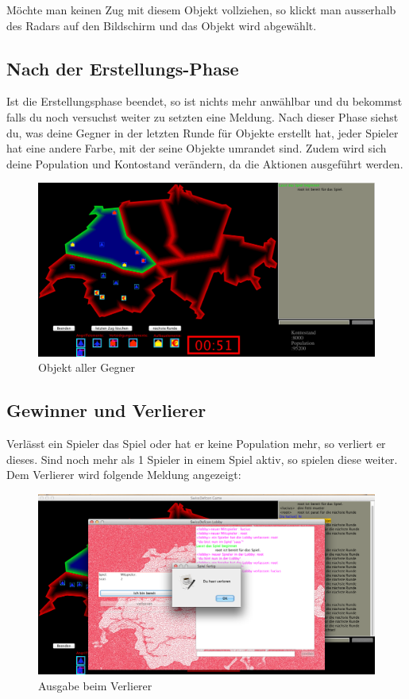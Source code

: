 \documentclass[ngerman, 12pt, pdftex]{scrartcl}[2006/07/30]
\begin{document}
Möchte man keinen Zug mit diesem Objekt vollziehen, so klickt man ausserhalb des Radars auf den Bildschirm und das Objekt wird abgewählt.

\newpage

\subsection{Nach der Erstellungs-Phase}

Ist die Erstellungsphase beendet, so ist nichts mehr anwählbar und du bekommst falls du noch versuchst weiter zu setzten eine Meldung.
Nach dieser Phase siehst du, was deine Gegner in der letzten Runde für Objekte erstellt hat, jeder Spieler hat eine andere Farbe, mit der seine Objekte umrandet sind. Zudem wird sich deine Population und Kontostand verändern, da die Aktionen ausgeführt werden.

\begin{figure}[h]
\centering
\includegraphics[scale=0.3]{spiel/Objekt_gegner.png}
\caption{Objekt aller Gegner}
\end{figure}

\newpage

\subsection{Gewinner und Verlierer}

Verlässt ein Spieler das Spiel oder hat er keine Population mehr, so verliert er dieses. Sind noch mehr als 1 Spieler in einem Spiel aktiv, so spielen diese weiter.
Dem Verlierer wird folgende Meldung angezeigt:

\begin{figure}[h]
\centering
\includegraphics[scale=0.29]{spiel/verloren.png}
\caption{Ausgabe beim Verlierer}
\end{figure}
\end{document}

